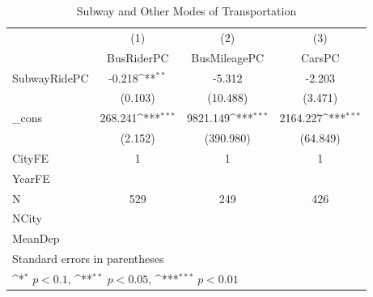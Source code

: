 \begin{table}[htbp]\centering
\def\sym#1{\ifmmode^{#1}\else\(^{#1}\)\fi}
\caption{Subway and Other Modes of Transportation}
\begin{tabular}{l*{3}{c}}
\hline\hline
            &\multicolumn{1}{c}{(1)}&\multicolumn{1}{c}{(2)}&\multicolumn{1}{c}{(3)}\\
            &\multicolumn{1}{c}{BusRiderPC}&\multicolumn{1}{c}{BusMileagePC}&\multicolumn{1}{c}{CarsPC}\\
\hline
SubwayRidePC&      -0.218\sym{**} &      -5.312         &      -2.203         \\
            &     (0.103)         &    (10.488)         &     (3.471)         \\
[1em]
\_cons      &     268.241\sym{***}&    9821.149\sym{***}&    2164.227\sym{***}\\
            &     (2.152)         &   (390.980)         &    (64.849)         \\
\hline
CityFE      &           1         &           1         &           1         \\
YearFE      &                     &                     &                     \\
N           &         529         &         249         &         426         \\
NCity       &                     &                     &                     \\
MeanDep     &                     &                     &                     \\
\hline\hline
\multicolumn{4}{l}{\footnotesize Standard errors in parentheses}\\
\multicolumn{4}{l}{\footnotesize \sym{*} \(p<0.1\), \sym{**} \(p<0.05\), \sym{***} \(p<0.01\)}\\
\end{tabular}
\end{table}
